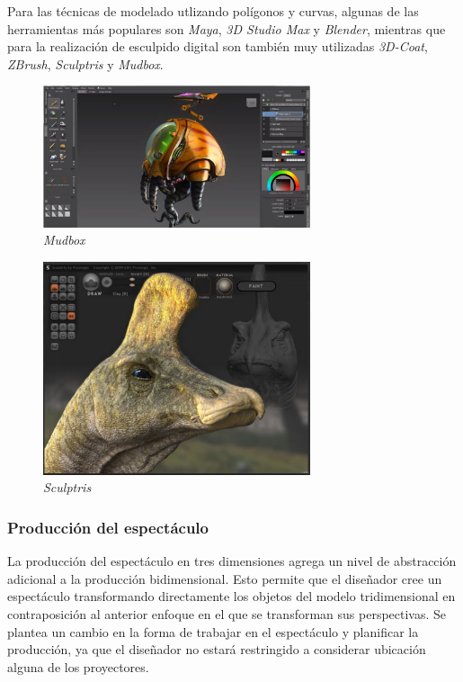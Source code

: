 Para las técnicas de modelado utlizando polígonos y curvas, algunas de las herramientas más populares son \emph{Maya}\cite{Maya}, \emph{3D Studio Max}\cite{3DStudioMax} y \emph{Blender}\cite{Blender}, mientras que para la realización de esculpido digital son también muy utilizadas \emph{3D-Coat}\cite{3DCoat}, \emph{ZBrush}\cite{Zbrush}, \emph{Sculptris}\cite{Sculptris} y \emph{Mudbox}\cite{Mudbox}. 

\begin{figure}[H]
  \centering
    \includegraphics[width=0.7\textwidth]{./Cap2_videomapping/mudbox.png}
  \caption[http://usa.autodesk.com]{\emph{Mudbox}}
  \label{fig:Mudbox}
\end{figure}

\begin{figure}[H]
  \centering
    \includegraphics[width=0.7\textwidth]{./Cap2_videomapping/sculptris.png}
  \caption[http://www.pixologic.com/sculptris/]{\emph{Sculptris}}
  \label{fig:Sculptris}
\end{figure}
  
\subsubsection{Producción del espectáculo}
La producción del espectáculo en tres dimensiones agrega un nivel de abstracción adicional a la producción bidimensional. Esto permite que el diseñador cree un espectáculo transformando directamente los objetos del modelo tridimensional en contraposición al anterior enfoque en el que se transforman sus perspectivas.
Se plantea un cambio en la forma de trabajar en el espectáculo y planificar la producción, ya que el diseñador no estará restringido a considerar ubicación alguna de los proyectores.

